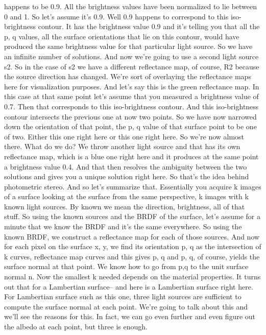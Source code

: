 \documentclass[12pt]{article}
\begin{document}
happens to be 0.9.
All the brightness values have been normalized
to lie between 0 and 1.
So let's assume it's 0.9.
Well 0.9 happens to correspond to this iso-brightness contour.
It has the brightness value 0.9
and it's telling you that all the p, q values, all
the surface orientations that lie on this contour,
would have produced the same brightness
value for that particular light source.
So we have an infinite number of solutions.
And now we're going to use a second light source s2.
So in the case of s2 we have a different reflectance map,
of course, R2 because the source direction has changed.
We're sort of overlaying the reflectance maps here
for visualization purposes.
And let's say this is the green reflectance map.
In this case at that same point let's assume
that you measured a brightness value of 0.7.
Then that corresponds to this iso-brightness contour.
And this iso-brightness contour intersects the previous one
at now two points.
So we have now narrowed down the orientation
of that point, the p, q value of that surface point
to be one of two.
Either this one right here or this one right here.
So we're now almost there.
What do we do?
We throw another light source and that has
its own reflectance map, which is a blue one right here
and it produces at the same point a brightness value 0.4.
And that then resolves the ambiguity between the two
solutions and gives you a unique solution right here.
So that's the idea behind photometric stereo.
And so let's summarize that.
Essentially you acquire k images of a surface looking
at the surface from the same perspective, k images with k
known light sources.
By known we mean the direction,
brightness, all of that stuff.
So using the known sources and the BRDF of the surface,
let's assume for a minute that we know the BRDF
and it's the same everywhere.
So using the known BRDF, we construct a reflectance map
for each of those sources.
And now for each pixel on the surface
x, y, we find its orientation p, q
as the intersection of k curves, reflectance map curves and this
gives p, q and p, q, of course, yields the surface
normal at that point.
We know how to go from p,q to the unit surface normal n.
Now the smallest k needed depends
on the material properties.
It turns out that for a Lambertian surface--
and here is a Lambertian surface right here.
For Lambertian surface such as this one,
three light sources are sufficient to compute
the surface normal at each point.
We're going to talk about this and we'll
see the reasons for this.
In fact, we can go even further and even figure out
the albedo at each point, but three is enough.
\end{document}
